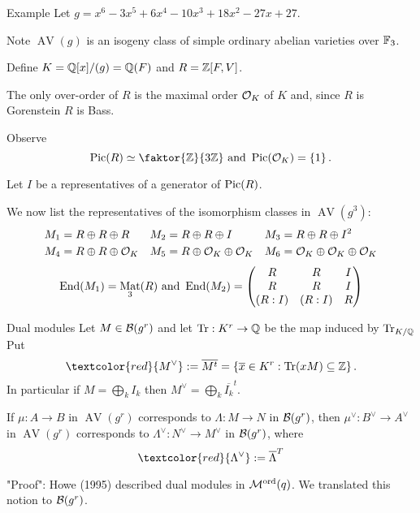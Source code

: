 \documentclass[usenames,dvipsnames]{beamer}
\DeclareMathOperator{\AV}{AV}
\DeclareMathOperator{\Mat}{Mat}
\newcommand{\Modord}[1]{\cM^{\text{ord}}({#1})}
\newcommand{\red}[1]{\textcolor{red}{#1}}
\begin{document}
\begin{frame}{ Example }
   Let $g=x^6 - 3x^5 + 6x^4 - 10x^3 + 18x^2 - 27x + 27$.
   
   \pause Note $\AV(g)$ is an isogeny class of simple ordinary abelian varieties over $\mathbb{F}_3$.
   
   \pause Define $K=\mathbb{Q}[x]/(g)=\mathbb{Q}(F)$ and $R=\mathbb{Z}[F,V]$.
   
   \pause The only over-order of $R$ is the maximal order ${\mathcal O}_K$ of $K$ and, since $R$ is Gorenstein
   $R$ is Bass.
   
   \pause Observe
   \[ \Pic(R) \simeq \faktor{\Z}{3\Z} \text{ and } \Pic(\cO_K)=\set{1}. \]
   
   \pause Let $I$ be a representatives of a generator of $\operatorname{Pic}(R)$.
   
   \pause We now list the representatives of the isomorphism classes in $\AV(g^3)$:
   \begin{align*}
	& M_1=R \oplus R \oplus R &
	& M_2=R \oplus R \oplus I &
	& M_3=R \oplus R \oplus I^2 \\
	& M_4=R \oplus R \oplus {\mathcal O}_K & 
	& M_5=R \oplus {\mathcal O}_K \oplus {\mathcal O}_K & 
	& M_6={\mathcal O}_K \oplus {\mathcal O}_K \oplus {\mathcal O}_K
   \end{align*}
   \pause 
   \[\End(M_1) = \Mat_3(R) \text{ and }
    \End(M_2)=
      \begin{pmatrix}
         R & R & I \\
         R & R & I \\
         (R:I) & (R:I) & R
      \end{pmatrix}\]
\end{frame}

\begin{frame}{ Dual modules }
Let $M \in {\mathcal B}(g^r)$ and let $\operatorname{Tr}:K^r \to \mathbb{Q}$ be the map induced by $\operatorname{Tr}_{K/\mathbb{Q}}$
\pause Put
\[ \red{M^\vee}:=\overline{M^t}=\set{ \overline{x} \in K^r : \Tr(xM)\subseteq \Z }. \]
\pause In particular if $M=\bigoplus_k I_k$ then $M^\vee=\bigoplus_k \overline{I_k}^t$.

\pause
\begin{prop}
 If $\mu:A\to B$ in $\AV(g^r)$ corresponds to $\Lambda:M\to N$ in ${\mathcal B}(g^r)$,
 \pause then $\mu^\vee:B^\vee\to A^\vee$ in $\AV(g^r)$ corresponds to $\Lambda^\vee:N^\vee\to M^\vee$ in ${\mathcal B}(g^r)$,
 where
 \[ \red{\Lambda^\vee} := \overline{\Lambda}^T \]
\end{prop}
"Proof": Howe (1995) described dual modules in $\Modord{q}$.  We translated this notion to ${\mathcal B}(g^r)$. 
\end{frame}
\end{document}
